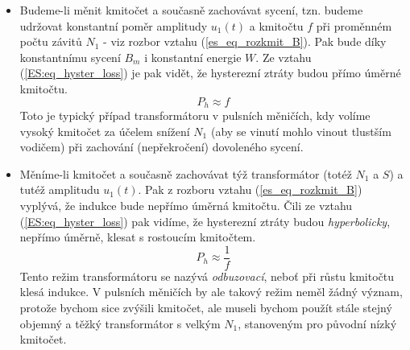       \begin{itemize}
        \item Budeme-li měnit kmitočet a současně zachovávat sycení, tzn. budeme udržovat  
              konstantní poměr amplitudy  $u_1(t)$ a kmitočtu $f$ při proměnném počtu závitů $N_1$ 
              - viz rozbor vztahu (\ref{es_eq_rozkmit_B}). Pak bude díky konstantnímu sycení $B_m$ 
              i konstantní energie $W$. Ze vztahu (\ref{ES:eq_hyster_loss}) je pak vidět, že 
              hysterezní ztráty budou přímo úměrné kmitočtu.
              \begin{equation}\label{ES:eq_hyst_loss_linf}
                P_h \approx f
              \end{equation}
              Toto je typický případ transformátoru v pulsních měničích, kdy volíme vysoký kmitočet 
              za účelem snížení  $N_1$ (aby se vinutí mohlo vinout tlustším vodičem) při zachování 
              (nepřekročení) dovoleného sycení.
        \item Měníme-li kmitočet a současně zachovávat týž transformátor (totéž $N_1$ a $S$) a  
              tutéž amplitudu $u_1(t)$. Pak z rozboru vztahu (\ref{es_eq_rozkmit_B}) vyplývá, že 
              indukce bude nepřímo úměrná kmitočtu.  Čili ze vztahu (\ref{ES:eq_hyster_loss}) pak 
              vidíme, že hysterezní ztráty budou \emph{hyperbolicky}, nepřímo úměrně, klesat s 
              rostoucím kmitočtem.
              \begin{equation}\label{ES:eq_hyst_loss_hypf}
                P_h \approx \frac{1}{f}
              \end{equation}
              Tento režim transformátoru se nazývá \emph{odbuzovací}, neboť při růstu kmitočtu 
              klesá indukce. V pulsních měničích by ale takový režim neměl žádný význam, protože 
              bychom sice zvýšili kmitočet, ale museli bychom použít stále stejný objemný a těžký 
              transformátor s velkým $N_1$, stanoveným pro původní nízký kmitočet.
      \end{itemize}

